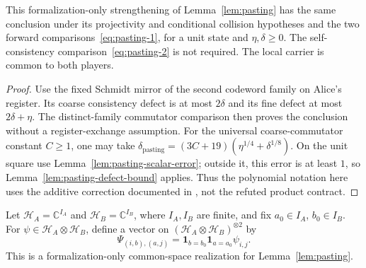 \begin{lemma}
	\label{lem:pasting-forward-comparisons}
	\leanok
	This formalization-only strengthening of Lemma~\ref{lem:pasting} has the
	same conclusion under its projectivity and conditional collision hypotheses
	and the two forward comparisons~\eqref{eq:pasting-1}, for a unit state and
	$\eta,\delta\geq0$. The self-consistency comparison~\eqref{eq:pasting-2}
	is not required. The local carrier is common to both players.
\end{lemma}
\begin{proof}
	\leanok
	Use the fixed Schmidt mirror of the second codeword family on Alice's
	register. Its coarse consistency defect is at most $2\delta$ and its fine
	defect at most $2\delta+\eta$. The distinct-family commutator comparison
	then proves the conclusion without a register-exchange assumption.
	For the universal coarse-commutator constant $C\geq1$, one may take
	$\delta_{\mathrm{pasting}}=(3C+19)(\eta^{1/4}+\delta^{1/8})$.
	On the unit square use Lemma~\ref{lem:pasting-scalar-error}; outside it,
	this error is at least $1$, so Lemma~\ref{lem:pasting-defect-bound} applies.
	Thus the polynomial notation here uses the additive correction documented
	in \cite{gap:qpbt_pasting-product-error}, not the refuted product contract.
\end{proof}

\begin{definition}
	\label{def:pasting-product-state}
	\leanok
	Let $\mathcal H_A=\mathbb C^{I_A}$ and $\mathcal H_B=\mathbb C^{I_B}$,
	where $I_A,I_B$ are finite, and fix $a_0\in I_A$, $b_0\in I_B$.
	For $\psi\in\mathcal H_A\otimes\mathcal H_B$, define a vector on
	$(\mathcal H_A\otimes\mathcal H_B)^{\otimes2}$ by
	\[
		\Psi_{(i,b),(a,j)}
		=\mathbf 1_{b=b_0}\mathbf 1_{a=a_0}\psi_{i,j}.
	\]
	This is a formalization-only common-space realization for
	Lemma~\ref{lem:pasting}.
\end{definition}

